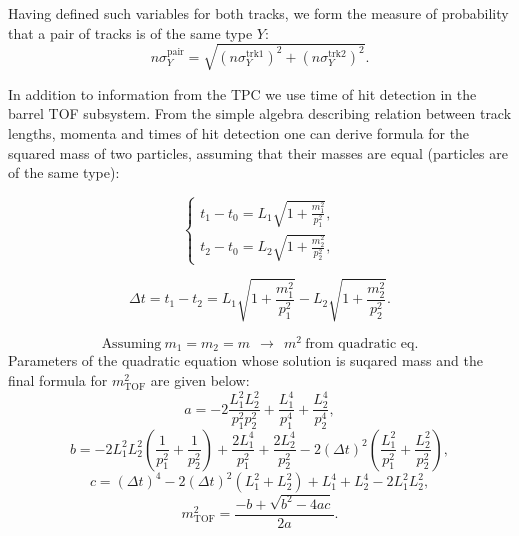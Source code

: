 \documentclass[a4paper,11pt]{article}
\begin{document}
Having defined such variables for both tracks, we form the measure of probability that a pair of tracks is of the same type $Y$:
\begin{equation}\label{eq:nSigmaPair}
 n\sigma_{Y}^{\text{pair}} = \sqrt{\left(n\sigma_{Y}^{\text{trk1}}\right)^{2} + \left(n\sigma_{Y}^{\text{trk2}}\right)^{2}}.
\end{equation}

In addition to information from the TPC we use time of hit detection in the barrel TOF subsystem. From the simple algebra describing relation between track lengths, momenta and times of hit detection one can derive formula for the squared mass of two particles, assuming that their masses are equal (particles are of the same type):

\begin{equation}
 \left\{\begin{array}{l}%
 t_{1}-t_{0} = L_{1}\sqrt{1+\frac{m_{1}^{2}}{p_{1}^{2}}}, \\[3pt]
 t_{2}-t_{0} = L_{2}\sqrt{1+\frac{m_{2}^{2}}{p_{2}^{2}}},
\end{array}\right.%
\end{equation}

\begin{equation}
 \Delta t = t_{1}-t_{2} = L_{1}\sqrt{1+\frac{m_{1}^{2}}{p_{1}^{2}}} - L_{2}\sqrt{1+\frac{m_{2}^{2}}{p_{2}^{2}}}.
\end{equation}

\[\textrm{Assuming}~m_{1}=m_{2}=m~~\rightarrow~~m^{2}~\textrm{from quadratic eq.}\]
Parameters of the quadratic equation whose solution is suqared mass and the final formula for $m^{2}_{\text{TOF}}$ are given below:
\begin{equation}
a= -2\frac{L^2_1L^2_2}{p^2_1p^2_2}+\frac{L^4_1}{p^4_1}+\frac{L^4_2}{p^4_2},
\end{equation}
\begin{equation}
b=-2L^2_1L^2_2\left({\frac{1}{p^2_1}} + {\frac{1}{p^2_2}}\right)+\frac{2L^4_1}{p_1^2}+\frac{2L^4_2}{p_2^2}-2\left(\Delta t\right)^2\left(\frac{L^2_1}{p_1^2}+\frac{L^2_2}{p_2^2}\right),
\end{equation}
\begin{equation}
c=\left(\Delta t\right)^4-2\left(\Delta t\right)^2\left(L^2_1+L^2_2\right)+L^4_1+L^4_2-2L^2_1L^2_2,
\end{equation}
\begin{equation}
 \label{eq:mSquared}
m^{2}_{\text{TOF}} = \frac{-b+\sqrt{b^2-4ac}}{2a}.
\end{equation}
\end{document}
